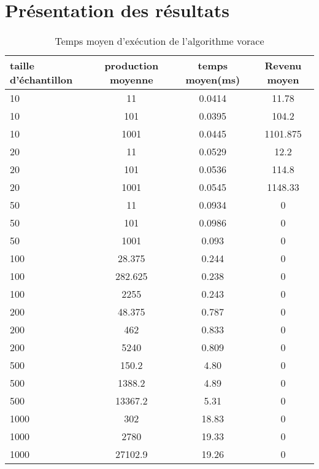 \documentclass[a4paper, 12pt]{article} %
\begin{document}
\section*{Présentation des résultats}
\begin{table}[H]
\caption{Temps moyen d'exécution de l'algorithme vorace}
\centering
\begin{tabular}{| l | c | c | c |}
\hline
taille d'échantillon & production moyenne & temps moyen(ms)  & Revenu moyen\\
\hline
10 & 11 & 0.0414 & 11.78\\
\hline
10 & 101 & 0.0395 & 104.2\\
\hline
10 & 1001 & 0.0445 & 1101.875\\
\hline
20 & 11 & 0.0529 & 12.2\\
\hline
20 & 101 & 0.0536 & 114.8\\
\hline
20 & 1001 & 0.0545 & 1148.33\\
\hline
50 & 11 & 0.0934 & 0\\
\hline
50 & 101 & 0.0986 & 0\\
\hline
50 & 1001 & 0.093 & 0\\
\hline
100 & 28.375 & 0.244 & 0\\
\hline
100 & 282.625 & 0.238 & 0\\
\hline
100 & 2255 & 0.243 & 0\\
\hline
200 & 48.375 & 0.787 & 0\\
\hline
200 & 462 & 0.833 & 0\\
\hline
200 & 5240 & 0.809 & 0\\
\hline
500 & 150.2 & 4.80 & 0\\
\hline
500 & 1388.2 & 4.89  & 0\\
\hline
500 & 13367.2 & 5.31 & 0\\
\hline
1000 & 302 & 18.83 & 0\\
\hline
1000 & 2780 & 19.33 & 0\\
\hline
1000 & 27102.9 & 19.26 & 0\\
\hline
\end{tabular}
\end{table}
\end{document}
